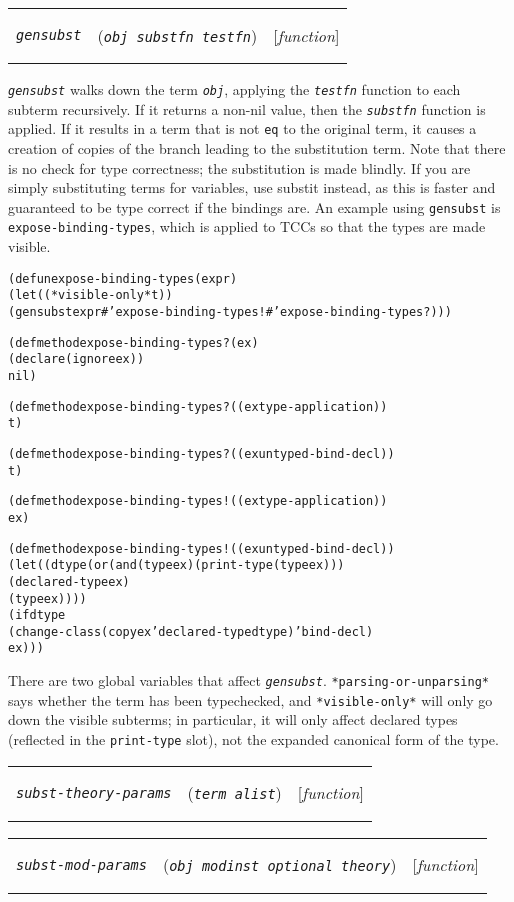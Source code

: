 \documentclass[12pt]{book}
\makeatletter
\def\ampoptional{{\smaller\sc {\smaller\smaller \&}optional\ }}
\newenvironment{function}[3]%
{\par\noindent\begin{boxedminipage}{\textwidth}%
 \par\noindent\begin{tabularx}{\linewidth}{l>{\raggedright}Xr}%
 \functionhtgt{#1}&(\texttt{\textit{#2}})&[\emph{#3}]%
 \end{tabularx}\par\flushright\begin{minipage}{.97\textwidth}}
{\end{minipage}\end{boxedminipage}}
\newcommand{\functionarg}[1]{\texttt{\textit{#1}}}
\newcommand{\functionnm}[1]{\texttt{\textit{#1}}}
\newcommand{\functionhtgt}[1]{\hypertarget{#1}{\functionnm{#1}}\index{#1@\functionnm{#1}|underline}}
\newenvironment{lispfunction}[2]%
{\begin{function}{#1}{#2}{function}}{\end{function}}
\makeatother
\begin{document}
\begin{lispfunction}{gensubst}{obj substfn testfn}
\functionnm{gensubst} walks down the term \functionarg{obj}, applying the
\functionarg{testfn} function to each subterm recursively.  If it returns
a non-nil value, then the \functionarg{substfn} function is applied.  If
it results in a term that is not \texttt{eq} to the original term, it
causes a creation of copies of the branch leading to the substitution
term.  Note that there is no check for type correctness; the substitution
is made blindly.  If you are simply substituting terms for variables, use
substit instead, as this is faster and guaranteed to be type correct if
the bindings are.  An example using \texttt{gensubst} is
\texttt{expose-binding-types}, which is applied to TCCs so that the types
are made visible.
\begin{alltt}
(defun expose-binding-types (expr)
  (let ((*visible-only* t))
    (gensubst expr #'expose-binding-types! #'expose-binding-types?)))

(defmethod expose-binding-types? (ex)
  (declare (ignore ex))
  nil)

(defmethod expose-binding-types? ((ex type-application))
  t)

(defmethod expose-binding-types? ((ex untyped-bind-decl))
  t)

(defmethod expose-binding-types! ((ex type-application))
  ex)

(defmethod expose-binding-types! ((ex untyped-bind-decl))
  (let ((dtype (or (and (type ex) (print-type (type ex)))
		   (declared-type ex)
		   (type ex))))
    (if dtype
	(change-class (copy ex 'declared-type dtype) 'bind-decl)
	ex)))
\end{alltt}

There are two global variables that affect \functionnm{gensubst}.  
\texttt{*parsing-or-unparsing*} says whether the term has been
typechecked, and \texttt{*visible-only*} will only go down the visible
subterms; in particular, it will only affect declared types (reflected in
the \texttt{print-type} slot), not the expanded canonical form of the
type.

\end{lispfunction}

\begin{lispfunction}{subst-theory-params}{term alist}
\end{lispfunction}

\begin{lispfunction}{subst-mod-params}{obj modinst \ampoptional theory}
\end{lispfunction}
\end{document}
